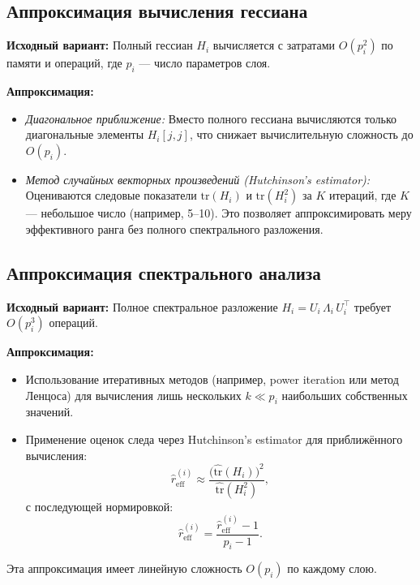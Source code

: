 \documentclass[a4paper,12pt]{article}
\begin{document}
\subsection*{Аппроксимация вычисления гессиана}

\textbf{Исходный вариант:} Полный гессиан \( H_i \) вычисляется с затратами \( O(p_i^2) \) по памяти и операций, где \( p_i \) --- число параметров слоя.

\textbf{Аппроксимация:}
\begin{itemize}
\item \emph{Диагональное приближение:} Вместо полного гессиана вычисляются только диагональные элементы \( H_i[j,j] \), что снижает вычислительную сложность до \( O(p_i) \).
\item \emph{Метод случайных векторных произведений (Hutchinson's estimator):} Оцениваются следовые показатели \(\text{tr}(H_i)\) и \(\text{tr}(H_i^2)\) за \( K \) итераций, где \( K \) --- небольшое число (например, 5--10). Это позволяет аппроксимировать меру эффективного ранга без полного спектрального разложения.
\end{itemize}

\subsection*{Аппроксимация спектрального анализа}

\textbf{Исходный вариант:} Полное спектральное разложение \( H_i = U_i\,\Lambda_i\,U_i^\top \) требует \( O(p_i^3) \) операций.

\textbf{Аппроксимация:}
\begin{itemize}
\item Использование итеративных методов (например, power iteration или метод Ленцоса) для вычисления лишь нескольких \( k \ll p_i \) наибольших собственных значений.
\item Применение оценок следа через Hutchinson's estimator для приближённого вычисления:
    \begin{equation}
        \widehat{r}_{\text{eff}}^{(i)} \approx \frac{\Big(\widehat{\text{tr}}(H_i)\Big)^2}{\widehat{\text{tr}}(H_i^2)},
    \end{equation}
    с последующей нормировкой:
    \begin{equation}
        \hat{r}_{\text{eff}}^{(i)} = \frac{\widehat{r}_{\text{eff}}^{(i)} - 1}{p_i - 1}.
    \end{equation}
\end{itemize}
Эта аппроксимация имеет линейную сложность \( O(p_i) \) по каждому слою.
\end{document}
